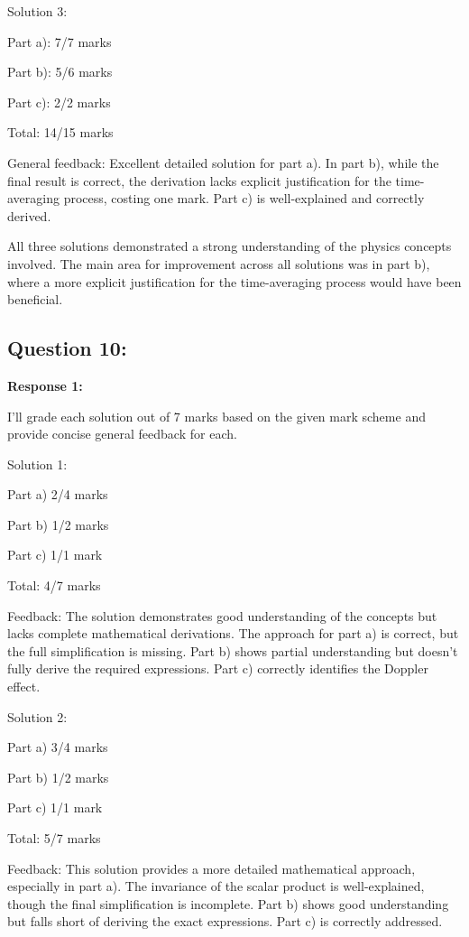 \documentclass[a4paper,11pt]{article}
\begin{document}
Solution 3:

Part a): 7/7 marks

Part b): 5/6 marks

Part c): 2/2 marks

Total: 14/15 marks

General feedback: Excellent detailed solution for part a). In part b), while the final result is correct, the derivation lacks explicit justification for the time-averaging process, costing one mark. Part c) is well-explained and correctly derived.

All three solutions demonstrated a strong understanding of the physics concepts involved. The main area for improvement across all solutions was in part b), where a more explicit justification for the time-averaging process would have been beneficial.

\subsection*{Question 10:}

\textbf{Response 1:}

I'll grade each solution out of 7 marks based on the given mark scheme and provide concise general feedback for each.

Solution 1:

Part a) 2/4 marks

Part b) 1/2 marks

Part c) 1/1 mark

Total: 4/7 marks

Feedback: The solution demonstrates good understanding of the concepts but lacks complete mathematical derivations. The approach for part a) is correct, but the full simplification is missing. Part b) shows partial understanding but doesn't fully derive the required expressions. Part c) correctly identifies the Doppler effect.

Solution 2:

Part a) 3/4 marks

Part b) 1/2 marks

Part c) 1/1 mark

Total: 5/7 marks

Feedback: This solution provides a more detailed mathematical approach, especially in part a). The invariance of the scalar product is well-explained, though the final simplification is incomplete. Part b) shows good understanding but falls short of deriving the exact expressions. Part c) is correctly addressed.
\end{document}
